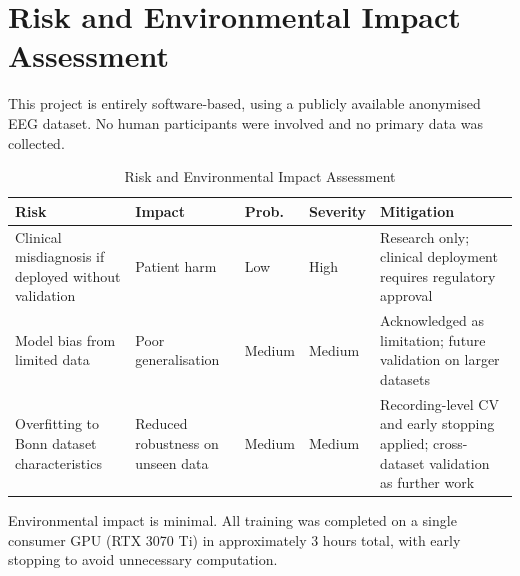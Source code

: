 \section*{Risk and Environmental Impact Assessment}
\setcounter{section}{6} \setcounter{subsection}{0}
 {}

This project is entirely software-based, using a publicly available anonymised EEG dataset. No human participants were involved and no primary data was collected.

\begin{table}[h]
  \centering
  \renewcommand{\arraystretch}{1.3}
  \caption{Risk and Environmental Impact Assessment}\vspace{0.5em}
  \label{table:risk}
  \small
  \begin{tabular}{|>{\raggedright\arraybackslash}p{3.3cm}|>{\raggedright\arraybackslash}p{2.7cm}|>{\raggedright\arraybackslash}p{1.7cm}|>{\raggedright\arraybackslash}p{1.4cm}|>{\raggedright\arraybackslash}p{4.4cm}|}
    \hline
    \textbf{Risk} & \textbf{Impact} & \textbf{Prob.} & \textbf{Severity} & \textbf{Mitigation} \\
    \hline
    Clinical misdiagnosis if deployed without validation & Patient harm & Low & High & Research only; clinical deployment requires regulatory approval \\
    \hline
    Model bias from limited data & Poor generalisation & Medium & Medium & Acknowledged as limitation; future validation on larger datasets \\
    \hline
    Overfitting to Bonn dataset characteristics & Reduced robustness on unseen data & Medium & Medium & Recording-level CV and early stopping applied; cross-dataset validation as further work \\
    \hline
  \end{tabular}
\end{table}

Environmental impact is minimal. All training was completed on a single consumer GPU (RTX 3070 Ti) in approximately 3 hours total, with early stopping to avoid unnecessary computation.

